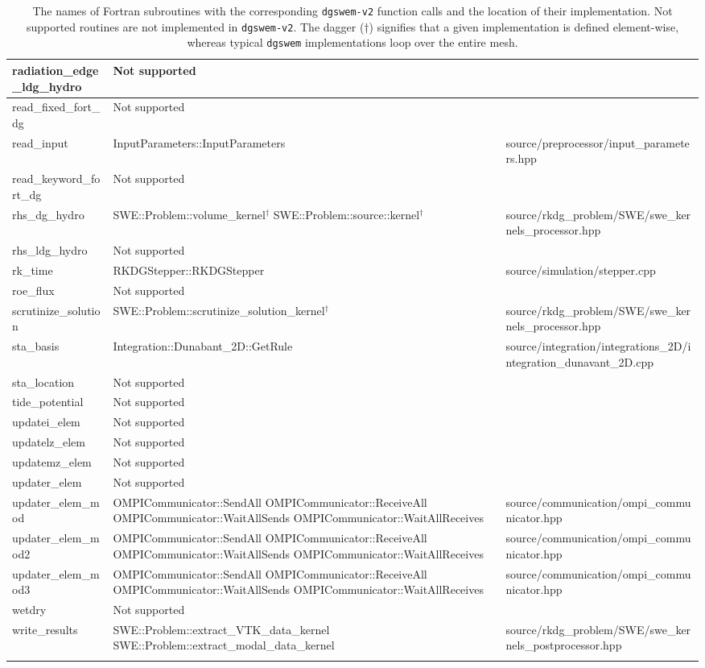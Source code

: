 {\begin{longtable}{ l | p{55mm} | p{86mm} }
\tabularnewline \hline
radiation\_edge\_ldg\_hydro & Not supported &	
\tabularnewline \hline
read\_fixed\_fort\_dg & Not supported &
\tabularnewline \hline
read\_input & InputParameters::InputParameters & source/preprocessor/input\_parameters.hpp
\tabularnewline \hline
read\_keyword\_fort\_dg & Not supported & 
\tabularnewline \hline
rhs\_dg\_hydro & SWE::Problem::volume\_kernel$^\dagger$ \newline SWE::Problem::source::kernel$^\dagger$ & source/rkdg_problem/SWE/swe\_kernels\_processor.hpp
\tabularnewline \hline
rhs\_ldg\_hydro & Not supported &	
\tabularnewline \hline
rk\_time	& RKDGStepper::RKDGStepper & source/simulation/stepper.cpp
\tabularnewline \hline
roe\_flux & Not supported &
\tabularnewline \hline
scrutinize\_solution & SWE::Problem::scrutinize\_solution\_kernel$^\dagger$ & source/rkdg_problem/SWE/swe\_kernels\_processor.hpp
\tabularnewline \hline
sta\_basis & Integration::Dunabant\_2D::GetRule & source/integration/integrations\_2D/integration\_dunavant\_2D.cpp
\tabularnewline \hline
sta\_location & Not supported &	
\tabularnewline \hline
tide\_potential	& Not supported &	
\tabularnewline \hline
updatei\_elem & Not supported &
\tabularnewline \hline
updatelz\_elem & Not supported &
\tabularnewline \hline
updatemz\_elem & Not supported &	
\tabularnewline \hline
updater\_elem & Not supported &	
\tabularnewline \hline
updater\_elem\_mod & OMPICommunicator::SendAll \newline OMPICommunicator::ReceiveAll \newline OMPICommunicator::WaitAllSends \newline OMPICommunicator::WaitAllReceives & source/communication/ompi\_communicator.hpp
\tabularnewline \hline
updater\_elem\_mod2 & OMPICommunicator::SendAll \newline OMPICommunicator::ReceiveAll \newline OMPICommunicator::WaitAllSends \newline OMPICommunicator::WaitAllReceives & source/communication/ompi\_communicator.hpp
\tabularnewline \hline
updater\_elem\_mod3 & OMPICommunicator::SendAll \newline OMPICommunicator::ReceiveAll \newline OMPICommunicator::WaitAllSends \newline OMPICommunicator::WaitAllReceives & source/communication/ompi\_communicator.hpp
\tabularnewline \hline
wetdry & Not supported	&
\tabularnewline \hline
write\_results & SWE::Problem::extract\_VTK\_data\_kernel \newline SWE::Problem::extract\_modal\_data\_kernel &	 source/rkdg_problem/SWE/swe\_kernels\_postprocessor.hpp
\tabularnewline \hline \hline
\caption{The names of Fortran subroutines with the corresponding \texttt{dgswem-v2} function calls and the location of their implementation. Not supported routines are not implemented in \texttt{dgswem-v2}. The dagger ($\dagger$) signifies that a given implementation is defined element-wise, whereas typical \texttt{dgswem} implementations loop over the entire mesh.}
\label{tab:dgswemtodgswemv2}
\end{longtable}
}
